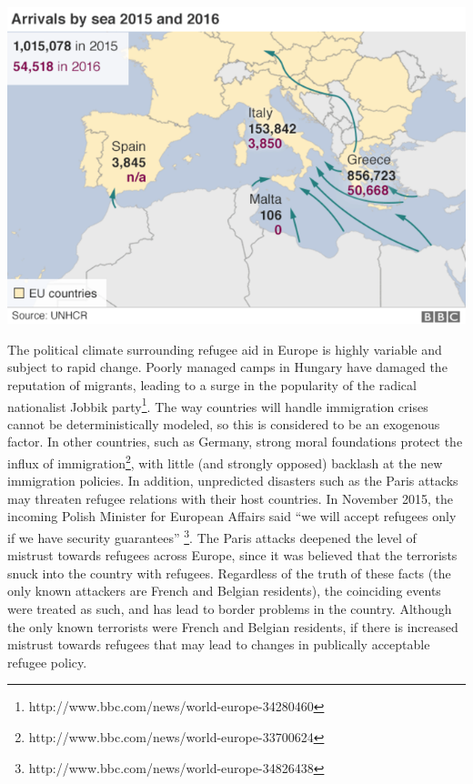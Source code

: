 \documentclass{article}
\begin{document}
\begin{center}
\includegraphics[scale=0.5]{travelmap}
\cite{BBCgraphics}
\end{center}

The political climate surrounding refugee aid in Europe is highly variable and subject to rapid change. Poorly managed camps in Hungary have damaged the reputation of migrants, leading to a surge in the popularity of the radical nationalist Jobbik party\footnote{http://www.bbc.com/news/world-europe-34280460}. The way countries will handle immigration crises cannot be deterministically modeled, so this is considered to be an exogenous factor. In other countries, such as Germany, strong moral foundations protect the influx of immigration\footnote{http://www.bbc.com/news/world-europe-33700624}, with little (and strongly opposed) backlash at the new immigration policies. In addition, unpredicted disasters such as the Paris attacks may threaten refugee relations with their host countries. In November 2015, the incoming Polish Minister for European Affairs said ``we will accept refugees only if we have security guarantees'' \footnote{http://www.bbc.com/news/world-europe-34826438}. The Paris attacks deepened the level of mistrust towards refugees across Europe, since it was believed that the terrorists snuck into the country with refugees. Regardless of the truth of these facts (the only known attackers are French and Belgian residents), the coinciding events were treated as such, and has lead to border problems in the country. Although the only known terrorists were French and Belgian residents, if there is increased mistrust towards refugees that may lead to changes in publically acceptable refugee policy.
\end{document}
